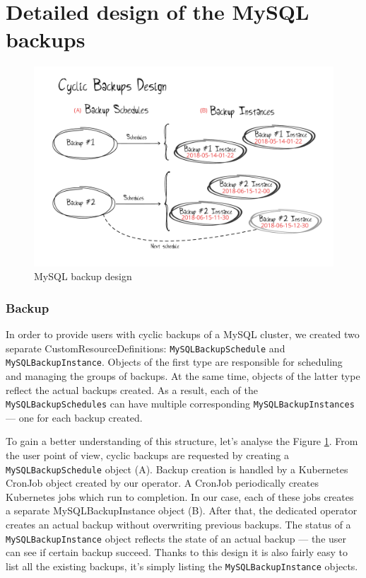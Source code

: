 \section{Detailed design of the MySQL backups}

\begin{figure}[!ht]
    \centering
    \includegraphics[width=1\textwidth, angle=0]{img/cyclic_backups.pdf}
    \caption{MySQL backup design}
    \label{fig:backups}
\end{figure}

\subsubsection*{Backup}
In order to provide users with cyclic backups of a MySQL cluster, we created 
two separate CustomResourceDefinitions: \texttt{MySQLBackupSchedule} and 
\texttt{MySQLBackupInstance}. Objects of the first type are responsible for 
scheduling and managing the groups of backups. At the same time, objects 
of the latter type reflect the actual backups created. As a result, each 
of the \texttt{MySQLBackupSchedules} can have multiple corresponding 
\texttt{MySQLBackupInstances} --- one for each backup created.

To gain a better understanding of this structure, let’s analyse the Figure 
\ref{fig:backups}. From the user point of view, cyclic backups are requested 
by creating a \texttt{MySQLBackupSchedule} object (A). Backup creation is handled 
by a Kubernetes CronJob object created by our operator. A CronJob periodically 
creates Kubernetes jobs which run to completion. In our case, each of these 
jobs creates a separate MySQLBackupInstance object (B). After that, the 
dedicated operator creates an actual backup without overwriting previous 
backups. The status of a \texttt{MySQLBackupInstance} object reflects the state of 
an actual backup --- the user can see if certain backup succeed. Thanks 
to this design it is also fairly easy to list all the existing backups, 
it’s simply listing the \texttt{MySQLBackupInstance} objects.

